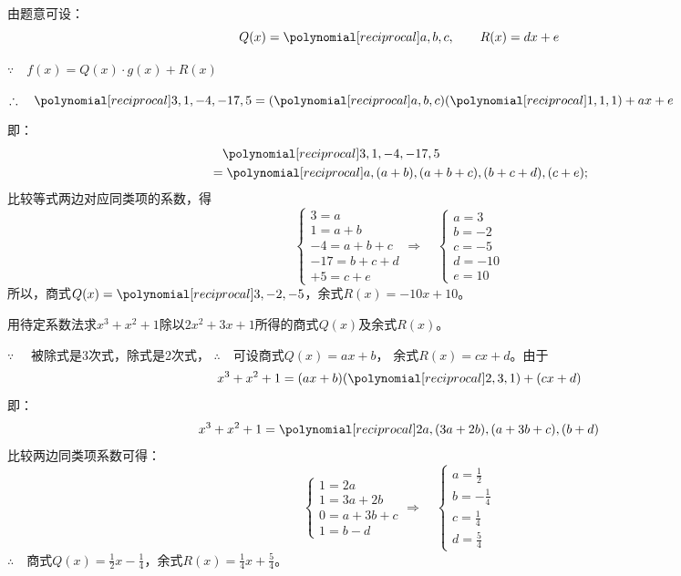 \begin{solution}
    由题意可设：
\[Q(x)=\poly{a,b,c},\qquad R(x)=dx+e\]

$\because\quad f(x)=Q(x)\cdot g(x)+R(x)$   

$\therefore\quad \poly{3,1,-4,-17,5}=(\poly{a,b,c})(\poly{1,1,1})+ax+e$

即：
\[\begin{split}
    &\quad \poly{3,1,-4,-17,5}\\
    &=\poly{a,(a+b),(a+b+c),(b+c+d),(c+e)};
\end{split}\] 
比较等式两边对应同类项的系数，得
\[\begin{cases}
    3=a\\
    1=a+b\\
    -4=a+b+c\\
    -17=b+c+d\\
    +5=c+e
\end{cases}\Rightarrow\quad  \begin{cases}
    a=3\\
    b=-2\\
    c=-5\\
    d=-10\\
    e=10
\end{cases}\]
所以，商式$Q(x)=\poly{3,-2,-5}$，余式$R(x)=-10x+10$。
\end{solution}

\begin{example}
    用待定系数法求$x^3+x^2+1$除以$2x^2+3x+1$所得的商式$Q(x)$及余式$R(x)$。
\end{example}

\begin{solution}
$\because\quad $ 被除式是3次式，除式是2次式，
$\therefore\quad $可设商式$Q(x)=ax+b$，
余式$R(x)=cx+d$。由于
\[x^3+x^2+1=(ax+b)(\poly{2,3,1})+(cx+d)\]
即：
\[x^3+x^2+1=\poly{2a, (3a+2b), (a+3b+c), (b+d)}\]
比较两边同类项系数可得：
\[\begin{cases}
  1=2a\\
  1=3a+2b\\
  0=a+3b+c\\
  1=b-d  
\end{cases}\Rightarrow\quad \begin{cases}
    a=\frac{1}{2}\\
    b=-\frac{1}{4}\\
    c=\frac{1}{4}\\
    d=\frac{5}{4}
\end{cases}\]
$\therefore\quad $商式$Q(x)=\frac{1}{2}x-\frac{1}{4}$，余式$R(x)=\frac{1}{4}x+\frac{5}{4}$。
\end{solution}

